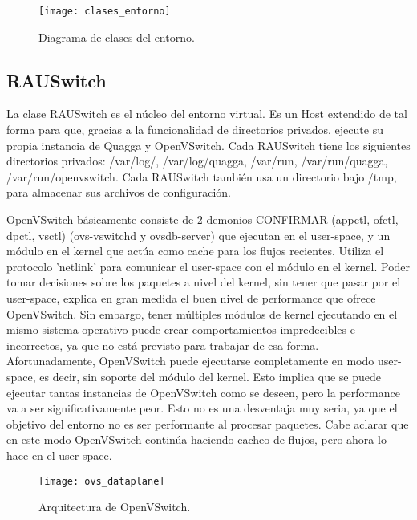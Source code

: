\begin{figure}[t]
	\caption{Diagrama de clases del entorno.}
	\texttt{[image: clases\_entorno]}
	\centering
	\label{fig:clases_entorno}
\end{figure}

\subsection{RAUSwitch}
La clase RAUSwitch es el núcleo del entorno virtual. Es un Host extendido de tal forma para que, gracias a la funcionalidad de directorios privados, ejecute su propia instancia de Quagga y OpenVSwitch. Cada RAUSwitch tiene los siguientes directorios privados: /var/log/, /var/log/quagga, /var/run, /var/run/quagga, /var/run/openvswitch. Cada RAUSwitch también usa un directorio bajo /tmp, para almacenar sus archivos de configuración.

OpenVSwitch básicamente consiste de 2 demonios CONFIRMAR (appctl, ofctl, dpctl, vsctl) (ovs-vswitchd y ovsdb-server) que ejecutan en el user-space, y un módulo en el kernel que actúa como cache para los flujos recientes. Utiliza el protocolo 'netlink' para comunicar el user-space con el módulo en el kernel. Poder tomar decisiones sobre los paquetes a nivel del kernel, sin tener que pasar por el user-space, explica en gran medida el buen nivel de performance que ofrece OpenVSwitch. Sin embargo, tener múltiples módulos de kernel ejecutando en el mismo sistema operativo puede crear comportamientos impredecibles e incorrectos, ya que no está previsto para trabajar de esa forma.\\
Afortunadamente, OpenVSwitch puede ejecutarse completamente en modo user-space, es decir, sin soporte del módulo del kernel. Esto implica que se puede ejecutar tantas instancias de OpenVSwitch como se deseen, pero la performance va a ser significativamente peor. Esto no es una desventaja muy seria, ya que el objetivo del entorno no es ser performante al procesar paquetes. Cabe aclarar que en este modo OpenVSwitch continúa haciendo cacheo de flujos, pero ahora lo hace en el user-space.

\begin{figure}[t]
	\caption{Arquitectura de OpenVSwitch.}
	\texttt{[image: ovs\_dataplane]}
	\centering
	\label{fig:ovs_dataplane}
\end{figure}

